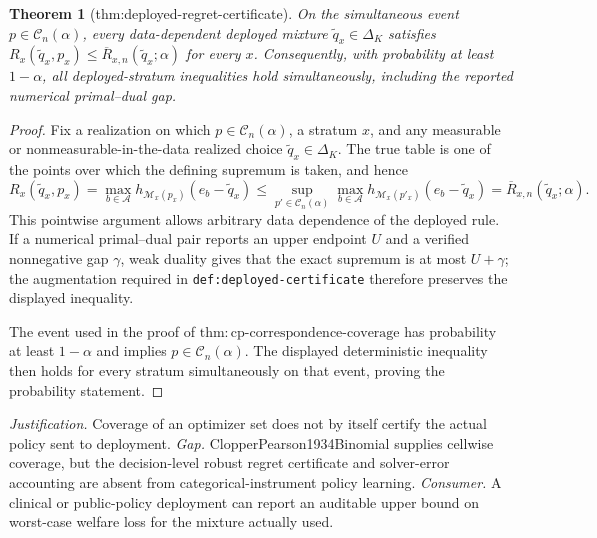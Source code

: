 \documentclass{article}
\newtheorem{theorem}{Theorem}
\begin{document}
\begin{theorem}[thm:deployed-regret-certificate]\label{thm:deployed-regret-certificate}
On the simultaneous event \(p\in\mathcal C_n(\alpha)\), every data-dependent deployed mixture \(\widetilde q_x\in\Delta_K\) satisfies \(R_x(\widetilde q_x,p_x)\leq\overline R_{x,n}(\widetilde q_x;\alpha)\) for every \(x\). Consequently, with probability at least \(1-\alpha\), all deployed-stratum inequalities hold simultaneously, including the reported numerical primal--dual gap.
\end{theorem}
\begin{proof}
Fix a realization on which \(p\in\mathcal C_n(\alpha)\), a stratum \(x\), and any measurable or nonmeasurable-in-the-data realized choice \(\widetilde q_x\in\Delta_K\).  The true table is one of the points over which the defining supremum is taken, and hence
\[
 R_x(\widetilde q_x,p_x)
 =\max_{b\in\mathcal A}h_{\mathcal M_x(p_x)}(e_b-\widetilde q_x)
 \leq\sup_{p'\in\mathcal C_n(\alpha)}\max_{b\in\mathcal A}h_{\mathcal M_x(p'_x)}(e_b-\widetilde q_x)
 =\overline R_{x,n}(\widetilde q_x;\alpha).
\]
This pointwise argument allows arbitrary data dependence of the deployed rule.  If a numerical primal--dual pair reports an upper endpoint \(U\) and a verified nonnegative gap \(\gamma\), weak duality gives that the exact supremum is at most \(U+\gamma\); the augmentation required in \texttt{def:deployed-certificate} therefore preserves the displayed inequality.

The event used in the proof of \(\mathrm{thm{:}cp\text{-}correspondence\text{-}coverage}\) has probability at least \(1-\alpha\) and implies \(p\in\mathcal C_n(\alpha)\).  The displayed deterministic inequality then holds for every stratum simultaneously on that event, proving the probability statement.
\end{proof}
\par\smallskip\noindent \textit{Justification.} Coverage of an optimizer set does not by itself certify the actual policy sent to deployment. \textit{Gap.} ClopperPearson1934Binomial supplies cellwise coverage, but the decision-level robust regret certificate and solver-error accounting are absent from categorical-instrument policy learning. \textit{Consumer.} A clinical or public-policy deployment can report an auditable upper bound on worst-case welfare loss for the mixture actually used.
\end{document}
